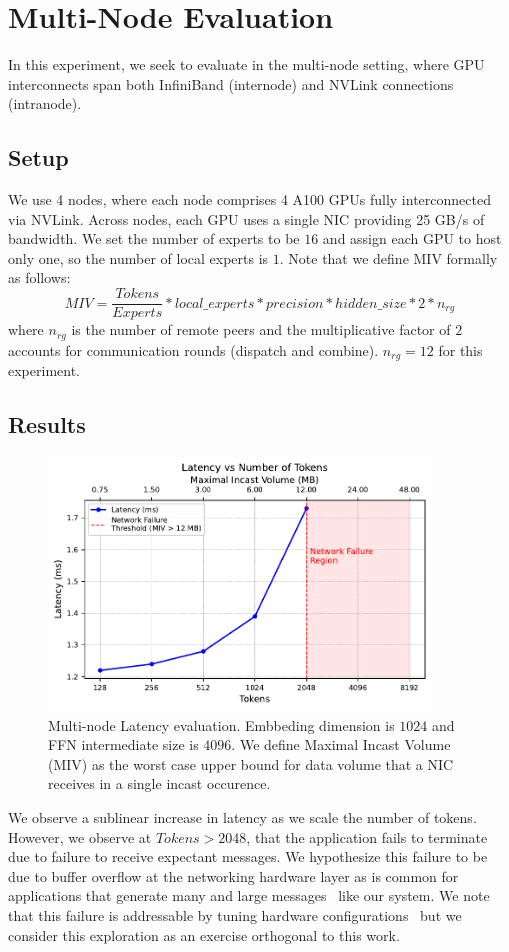 \section{Multi-Node Evaluation}\label{sec:multi-node-evaluation}
In this experiment, we seek to evaluate \sysname in the multi-node setting, where GPU interconnects
span both InfiniBand (internode) and NVLink connections (intranode).
\subsection{Setup}\label{subsec:setup}
We use 4 nodes, where each node comprises 4 A100 GPUs fully interconnected via NVLink.
Across nodes, each GPU uses a single NIC providing 25 GB/s of bandwidth.
We set the number of experts to be $16$ and assign each GPU to host only one,
so the number of local experts is $1$.
Note that we define MIV formally as follows:
\[
    MIV = \frac{Tokens}{Experts} * local\_{experts} * precision * hidden\_size * 2 * n_{rg}
\]
where $n_{rg}$ is the number of remote peers and the multiplicative
factor of $2$ accounts for communication rounds (dispatch and combine).
$n_{rg} = 12$ for this experiment.
\subsection{Results}\label{subsec:results}
\begin{figure} [!ht]
    \centering
    \includegraphics[width=4in,keepaspectratio]{figures/multi_node_fail}
    \caption{Multi-node Latency evaluation.
    Embbeding dimension is $1024$ and FFN intermediate size is $4096$.
    We define Maximal Incast Volume (MIV) as the worst case upper bound for data volume that a
    NIC receives in a single incast occurence.}
    \label{fig:multi_fail}
\end{figure}
We observe a sublinear increase in latency as we scale the number of tokens.
However, we observe at $Tokens > 2048$, that the application fails to terminate
due to failure to receive expectant messages.
We hypothesize this failure to be due to buffer overflow at the networking hardware layer as is common for applications
that generate many and large messages~\cite{nerscNetworkNERSC} like our system.
We note that this failure is addressable by tuning hardware configurations~\cite{ofiwgFi_cxi7} but we consider
this exploration as an exercise orthogonal to this work.
